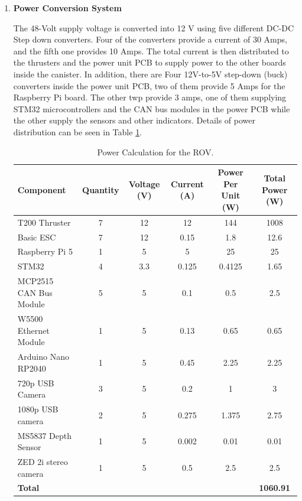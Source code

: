 \vspace{-0.5\baselineskip}
\begin{enumerate}[label=(\roman*), leftmargin=0pt, itemindent=20pt]
    \setlength{\itemsep}{0pt}
    \item \textbf{Power Conversion System}
    
    The 48-Volt supply voltage is converted into 12 V using five different DC-DC Step down converters. Four of the converters provide a current of 30 Amps, and the fifth one provides 10 Amps. The total current is then distributed to the thrusters and the power unit PCB to supply power to the other boards inside the canister. In addition, there are Four 12V-to-5V step-down (buck) converters inside the power unit PCB, two of them provide 5 Amps for the Raspberry Pi board. The other twp provide 3 amps, one of them supplying STM32 microcontrollers and the CAN bus modules in the power PCB while the other supply the sensors and other indicators. Details of power distribution can be seen in Table \ref{tab:power_calculation}.

    \begin{table}[h]
        \centering
        \begin{adjustbox}{max width=\columnwidth}
        \begin{tabular}{@{} l *{5}{c} @{}}
          \toprule
          \textbf{Component} & \textbf{Quantity} & \textbf{Voltage (V)} & \textbf{Current (A)} & \textbf{Power Per Unit (W)} & \textbf{Total Power (W)} \\
          \midrule
          T200 Thruster            & 7 & 12   & 12     & 144    & 1008   \\
          Basic ESC                & 7 & 12   & 0.15   & 1.8    & 12.6   \\
          Raspberry Pi 5           & 1 & 5    & 5      & 25     & 25     \\
          STM32                    & 4 & 3.3  & 0.125  & 0.4125 & 1.65   \\
          MCP2515 CAN Bus Module   & 5 & 5    & 0.1    & 0.5    & 2.5    \\
          W5500 Ethernet Module    & 1 & 5    & 0.13   & 0.65   & 0.65   \\
          Arduino Nano RP2040      & 1 & 5    & 0.45   & 2.25   & 2.25   \\
          720p USB Camera          & 3 & 5    & 0.2    & 1      & 3      \\
          1080p USB camera         & 2 & 5    & 0.275  & 1.375  & 2.75   \\
          MS5837 Depth Sensor      & 1 & 5    & 0.002  & 0.01   & 0.01   \\
          ZED 2i stereo camera     & 1 & 5    & 0.5    & 2.5    & 2.5    \\
          \midrule
         \multicolumn{5}{l}{\textbf{Total}} & \textbf{1060.91} \\
          \bottomrule
        \end{tabular}
        \end{adjustbox}
    \caption{Power Calculation for the ROV.}
    \label{tab:power_calculation}
    \end{table}


\end{enumerate}
